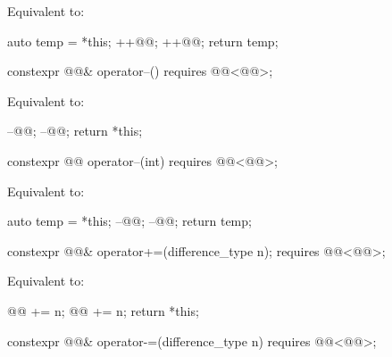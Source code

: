 \documentclass{wg21}
\begin{document}
\begin{itemdescr}
    \pnum
    \effects
    Equivalent to:
    \begin{codeblock}
        auto temp = *this;
        ++@@;
        ++@@;
        return temp;
    \end{codeblock}
\end{itemdescr}

\begin{itemdecl}
    constexpr @@& operator--() requires @@<@@>;
\end{itemdecl}

\begin{itemdescr}
    \pnum
    \effects
    Equivalent to:
    \begin{codeblock}
        --@@;
        --@@;
        return *this;
    \end{codeblock}
\end{itemdescr}

\begin{itemdecl}
    constexpr @@ operator--(int) requires @@<@@>;
\end{itemdecl}

\begin{itemdescr}
    \pnum
    \effects
    Equivalent to:
    \begin{codeblock}
        auto temp = *this;
        --@@;
        --@@;
        return temp;
    \end{codeblock}
\end{itemdescr}

\begin{itemdecl}
    constexpr @@& operator+=(difference_type n);
    requires @@<@@>;
\end{itemdecl}

\begin{itemdescr}
    \pnum
    \effects
    Equivalent to:
    \begin{codeblock}
        @@ += n;
        @@ += n;
        return *this;
    \end{codeblock}
\end{itemdescr}

\begin{itemdecl}
    constexpr @@& operator-=(difference_type n)
    requires @@<@@>;
\end{itemdecl}
\end{document}
